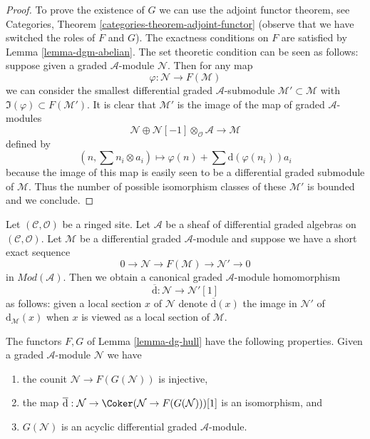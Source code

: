 \begin{proof}
To prove the existence of $G$ we can use the adjoint functor theorem, see
Categories, Theorem \ref{categories-theorem-adjoint-functor} (observe that
we have switched the roles of $F$ and $G$). The exactness conditions on
$F$ are satisfied by Lemma \ref{lemma-dgm-abelian}. The set theoretic
condition can be seen as follows: suppose given a graded $\mathcal{A}$-module
$\mathcal{N}$. Then for any map
$$
\varphi : \mathcal{N} \longrightarrow F(\mathcal{M})
$$
we can consider the smallest differential graded $\mathcal{A}$-submodule
$\mathcal{M}' \subset \mathcal{M}$ with
$\Im(\varphi) \subset F(\mathcal{M}')$.
It is clear that $\mathcal{M}'$ is the image of the map
of graded $\mathcal{A}$-modules
$$
\mathcal{N} \oplus
\mathcal{N}[-1] \otimes_\mathcal{O} \mathcal{A}
\longrightarrow
\mathcal{M}
$$
defined by
$$
(n, \sum n_i \otimes a_i) \longmapsto
\varphi(n) + \sum \text{d}(\varphi(n_i)) a_i
$$
because the image of this map is easily seen to be a differential graded
submodule of $\mathcal{M}$.
Thus the number of possible isomorphism classes of these $\mathcal{M}'$
is bounded and we conclude.
\end{proof}

\noindent
Let $(\mathcal{C}, \mathcal{O})$ be a ringed site.
Let $\mathcal{A}$ be a sheaf of differential graded algebras
on $(\mathcal{C}, \mathcal{O})$. Let $\mathcal{M}$ be a differential
graded $\mathcal{A}$-module and suppose we have a short exact sequence
$$
0 \to \mathcal{N} \to F(\mathcal{M}) \to \mathcal{N}' \to 0
$$
in $\textit{Mod}(\mathcal{A})$. Then we obtain a canonical
graded $\mathcal{A}$-module homomorphism
$$
\overline{\text{d}} : \mathcal{N} \to \mathcal{N}'[1]
$$
as follows: given a local section $x$ of $\mathcal{N}$ denote
$\overline{\text{d}}(x)$ the image in $\mathcal{N}'$ of
$\text{d}_\mathcal{M}(x)$ when $x$ is viewed as a local section
of $\mathcal{M}$.

\begin{lemma}
\label{lemma-dg-hull-acyclic}
The functors $F, G$ of Lemma \ref{lemma-dg-hull} have
the following properties. Given a graded $\mathcal{A}$-module
$\mathcal{N}$ we have
\begin{enumerate}
\item the counit $\mathcal{N} \to F(G(\mathcal{N}))$ is injective,
\item the map $\overline{\text{d}} : \mathcal{N} \to
\Coker(\mathcal{N} \to F(G(\mathcal{N})))[1]$ is an isomorphism, and
\item $G(\mathcal{N})$ is an acyclic differential graded $\mathcal{A}$-module.
\end{enumerate}
\end{lemma}

